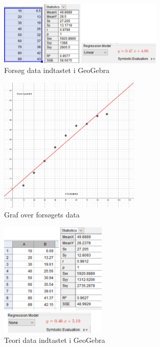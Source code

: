 \begin{figure}[htbp]
    \centering
    \includegraphics[width=0.7\textwidth]{figures/brydningsvinkelforsoggraf.png}
    \caption{Forsøg data indtastet i GeoGebra}
\end{figure}
\begin{figure}[htbp]
    \centering
    \includegraphics[width=0.6\textwidth]{figures/brydningsvinkelforsoggraf2.png}
    \caption{Graf over forsøgets data}
\end{figure}
\begin{figure}[htbp]
    \centering
    \includegraphics[width=0.45\textwidth]{figures/brydningsvinkelteorigraf.png}
    \caption{Teori data indtastet i GeoGebra}
\end{figure}

